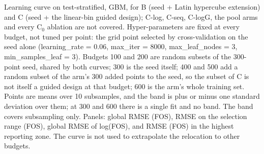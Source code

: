 Learning curve on test-stratified, GBM, for B (seed + Latin hypercube extension) and C (seed + the linear-bin guided design); C-log, C-seq, C-logG, the pool arms and every C$_0$ ablation are not covered. Hyper-parameters are fixed at every budget, not tuned per point: the grid point selected by cross-validation on the seed alone (learning\_rate = 0.06, max\_iter = 8000, max\_leaf\_nodes = 3, min\_samples\_leaf = 3). Budgets 100 and 200 are random subsets of the 300-point seed, shared by both curves; 300 is the seed itself; 400 and 500 add a random subset of the arm's 300 added points to the seed, so the subset of C is not itself a guided design at that budget; 600 is the arm's whole training set. Points are means over 10 subsamples, and the band is plus or minus one standard deviation over them; at 300 and 600 there is a single fit and no band. The band covers subsampling only. Panels: global RMSE (FOS), RMSE on the selection range (FOS), global RMSE of log(FOS), and RMSE (FOS) in the highest reporting zone. The curve is not used to extrapolate the relocation to other budgets.
